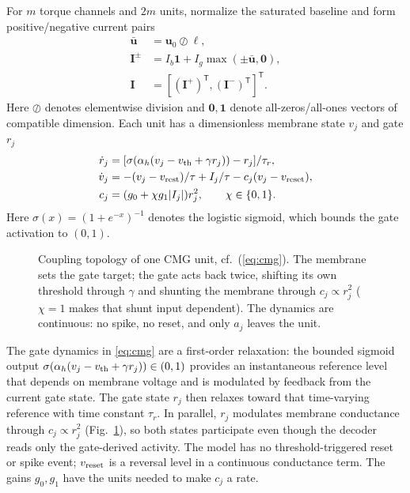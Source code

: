 \documentclass[letterpaper, 10 pt, conference]{ieeeconf}
\newcommand{\T}{^{\mathsf T}}
\begin{document}
For $m$ torque channels and $2m$ units, normalize the saturated baseline and form positive/negative current pairs
\begin{equation}
 \begin{aligned}
 \bar{\bm u}&=\bm u_0\oslash\bm\ell,\\
 \bm I^{\pm}&=I_b\bm1+I_g\max(\pm\bar{\bm u},\bm0),\\
 \bm I&=[(\bm I^+)\T,(\bm I^-)\T]\T.
 \end{aligned}
 \label{eq:encoding}
\end{equation}
Here $\oslash$ denotes elementwise division and $\bm 0,\bm 1$ denote all-zeros/all-ones vectors of compatible dimension. Each unit has a dimensionless membrane state $v_j$ and gate $r_j$
\begin{align}
 \dot r_j&=[\sigma(\alpha_h(v_j-v_{\rm th}+\gamma r_j))-r_j]/\tau_r,\\
 \dot v_j&=-(v_j-v_{\rm rest})/\tau+I_j/\tau-c_j(v_j-v_{\rm reset}),\\
 c_j&=(g_0+\chi g_1|I_j|)r_j^2,\qquad \chi\in\{0,1\}.
 \label{eq:cmg}
\end{align}
Here $\sigma(x)=(1+e^{-x})^{-1}$ denotes the logistic sigmoid, which bounds the gate activation to $(0,1)$.

\begin{figure}[t]
\centering
\resizebox{0.86\columnwidth}{!}{}
\caption{Coupling topology of one CMG unit, cf.~(\ref{eq:cmg}). The membrane sets
 the gate target; the gate acts back twice, shifting its own threshold through
 $\gamma$ and shunting the membrane through $c_j\propto r_j^2$ ($\chi=1$ makes
 that shunt input dependent). The dynamics are continuous: no spike, no reset,
 and only $a_j$ leaves the unit.}
\label{fig:cmgunit}
\end{figure}


%
The gate dynamics in \eqref{eq:cmg} are a first-order relaxation: the bounded sigmoid output $\sigma(\alpha_h(v_j-v_{\rm th}+\gamma r_j))\in(0,1)$ provides an instantaneous reference level that depends on membrane voltage and is modulated by feedback from the current gate state. The gate state $r_j$ then relaxes toward that time-varying reference with time constant $\tau_r$. In parallel, $r_j$ modulates membrane conductance through $c_j\propto r_j^2$ (Fig.~\ref{fig:cmgunit}), so both states participate even though the decoder reads only the gate-derived activity. The model has no threshold-triggered reset or spike event; $v_{\rm reset}$ is a reversal level in a continuous conductance term. The gains $g_0,g_1$ have the units needed to make $c_j$ a rate.
\end{document}

